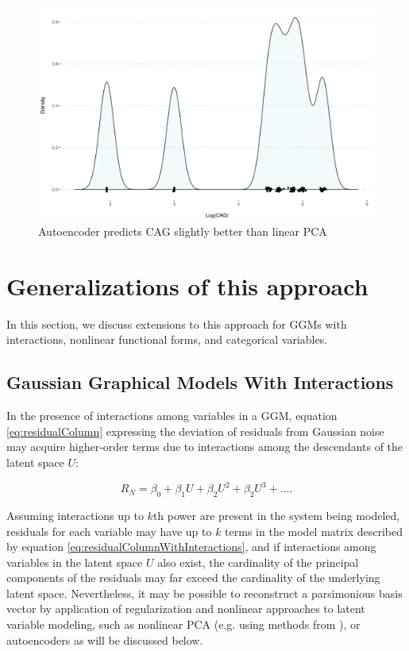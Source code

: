 \documentclass[letterpaper]{article}
\begin{document}
\begin{figure}[ht!]
  \centering
    \includegraphics[width=\linewidth,page=2]{./images/cagPlots.pdf}
    \caption{\label{fig_cag_linear} Autoencoder predicts CAG slightly better than linear PCA}
\end{figure}
\medskip


\section{Generalizations of this approach}
In this section, we discuss extensions to this approach for GGMs with interactions, nonlinear functional forms, and categorical variables. 

\subsection{Gaussian Graphical Models With Interactions}
In the presence of interactions among variables in a GGM, equation \ref{eq:residualColumn} expressing the deviation of residuals from Gaussian noise may acquire higher-order terms due to interactions among the descendants of the latent space $U$:

\begin{equation}
R_N = \beta_0 + \beta_1 U + \beta_2 U^2 + \beta_2 U^3 + \dots.
\label{eq:residualColumnWithInteractions}
\end{equation}

Assuming interactions up to $k$th power are present in the system being modeled, residuals for each variable may have up to $k$ terms in the model matrix described by equation \ref{eq:residualColumnWithInteractions}, and if interactions among variables in the latent space $U$ also exist, the cardinality of the principal components of the residuals may far exceed the cardinality of the underlying latent space.  Nevertheless, it may be possible to reconstruct a parsimonious basis vector by application of regularization and nonlinear approaches to latent variable modeling, such as nonlinear PCA (e.g. using methods from \cite{karatzoglou_kernlab_2004}), or autoencoders \cite{louizos_causal_2017} as will be discussed below.
\end{document}
